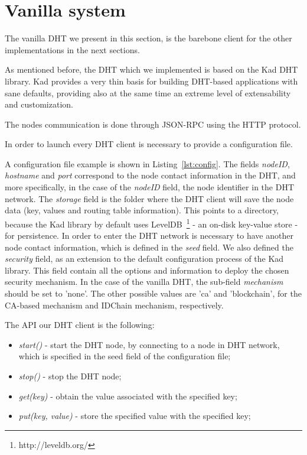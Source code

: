 \section{Vanilla system}

The vanilla \ac{DHT} we present in this section, is the barebone \ac{client} for the other implementations in the next sections.

As mentioned before, the \ac{DHT} which we implemented is based on the Kad DHT library.
Kad provides a very thin basis for building DHT-based applications with sane defaults, providing also at the same time an extreme level of extensability and customization.

The nodes communication is done through JSON-RPC using the \ac{HTTP} protocol.

In order to launch every DHT client is necessary to provide a configuration file.



A configuration file example is shown in Listing~\ref{lst:config}.
The fields \textit{nodeID}, \textit{hostname} and \textit{port} correspond to the node contact information in the DHT, and more specifically, in the case of the \textit{nodeID} field, the node identifier in the DHT network.
The \textit{storage} field is the folder where the DHT client will save the node data (key, values and routing table information). This points to a directory, because the Kad library by default uses LevelDB~\footnote{http://leveldb.org/} - an on-disk key-value store - for persistence.
In order to enter the DHT network is necessary to have another node contact information, which is defined in the \textit{seed} field.
We also defined the \textit{security} field, as an extension to the default configuration process of the Kad library.
This field contain all the options and information to deploy the chosen security mechanism.
In the case of the vanilla DHT, the sub-field \textit{mechanism} should be set to 'none'.
The other possible values are 'ca' and 'blockchain', for the CA-based mechanism and IDChain mechanism, respectively.

The \ac{API} our DHT client is the following:

\begin{itemize}
  \item \textit{start()} - start the DHT node, by connecting to a node in DHT network, which is specified in the seed field of the configuration file;
  \item \textit{stop()} - stop the DHT node;
  \item \textit{get(key)} - obtain the value associated with the specified key;
  \item \textit{put(key, value)} - store the specified value with the specified key;
\end{itemize}

